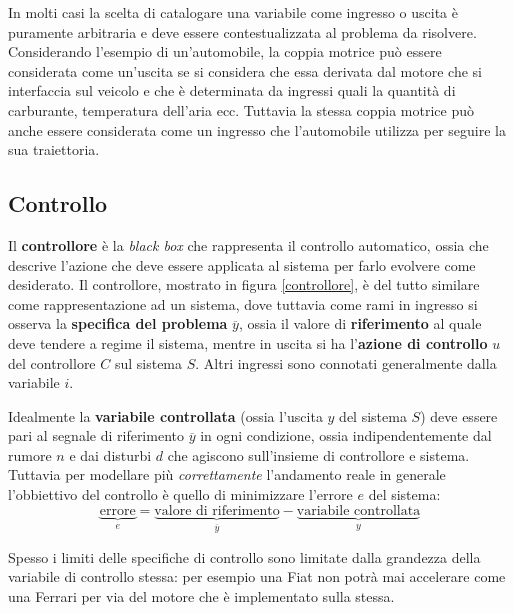     	In molti casi la scelta di catalogare una variabile come ingresso o uscita è puramente arbitraria e deve essere contestualizzata al problema da risolvere. Considerando l'esempio di un'automobile, la coppia motrice può essere considerata come un'uscita se si considera che essa derivata dal motore che si interfaccia sul veicolo e che è determinata da ingressi quali la quantità di carburante, temperatura dell'aria ecc. Tuttavia la stessa coppia motrice può anche essere considerata come un ingresso che l'automobile utilizza per seguire la sua traiettoria.
    	
    \subsection{Controllo}
        \begin{concetto}
                Il \textbf{controllore} è la \textit{black box} che rappresenta il controllo automatico, ossia che descrive l'azione che deve essere applicata al sistema per farlo evolvere come desiderato. Il controllore, mostrato in figura \ref{controllore}, è del tutto similare come rappresentazione ad un sistema, dove tuttavia come rami in ingresso si osserva la \textbf{specifica del problema} $\overline y$, ossia il valore di \textbf{riferimento} al quale deve tendere a regime il sistema, mentre in uscita si ha l'\textbf{azione di controllo} $u$ del controllore $C$ sul sistema $S$. Altri ingressi sono connotati generalmente dalla variabile $i$.
         \end{concetto}
    	
    	
    	Idealmente la \textbf{variabile controllata} (ossia l'uscita $y$ del sistema $S$) deve essere pari al segnale di riferimento $\overline y$ in ogni condizione, ossia indipendentemente dal rumore $n$ e dai disturbi $d$ che agiscono sull'insieme di controllore e sistema. Tuttavia per modellare più \textit{correttamente} l'andamento reale in generale l'obbiettivo del controllo è quello di minimizzare l'errore $e$ del sistema:
    	\begin{equation}
    	    \underbrace{\textrm{errore}}_e = \underbrace{\textrm{valore di riferimento}}_{\overline y} - \underbrace{\textrm{variabile controllata}}_y
    	\end{equation}
    	
    	Spesso i limiti delle specifiche di controllo sono limitate dalla grandezza della variabile di controllo stessa: per esempio una Fiat non potrà mai accelerare come una Ferrari per via del motore che è implementato sulla stessa.
    	
